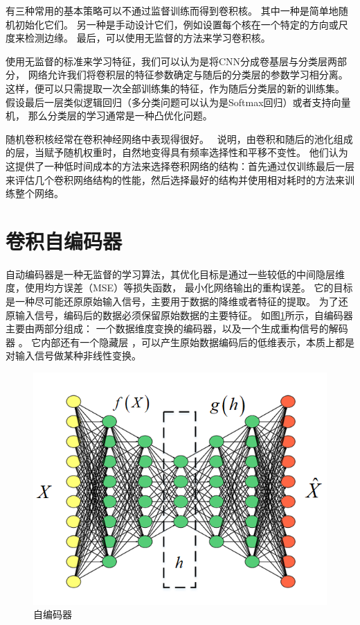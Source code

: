 有三种常用的基本策略可以不通过监督训练而得到卷积核。
其中一种是简单地随机初始化它们。
另一种是手动设计它们，例如设置每个核在一个特定的方向或尺度来检测边缘。
最后，可以使用无监督的方法来学习卷积核。\par

使用无监督的标准来学习特征，我们可以认为是将CNN分成卷基层与分类层两部分，
网络允许我们将卷积层的特征参数确定与随后的分类层的参数学习相分离。
这样，便可以只需提取一次全部训练集的特征，作为随后分类层的新的训练集。
假设最后一层类似逻辑回归（多分类问题可以认为是Softmax回归）或者支持向量机，
那么分类层的学习通常是一种凸优化问题。\par
随机卷积核经常在卷积神经网络中表现得很好。
\cite{Saxe-ICML2011}~说明，由卷积和随后的池化组成的层，当赋予随机权重时，自然地变得具有频率选择性和平移不变性。
他们认为这提供了一种低时间成本的方法来选择卷积网络的结构：首先通过仅训练最后一层来评估几个卷积网络结构的性能，然后选择最好的结构并使用相对耗时的方法来训练整个网络。

\section{卷积自编码器}

自动编码器是一种无监督的学习算法，其优化目标是通过一些较低的中间隐层维度，使用均方误差（MSE）等损失函数，
最小化网络输出的重构误差。
它的目标是一种尽可能还原原始输入信号，主要用于数据的降维或者特征的提取。
为了还原输入信号，编码后的数据必须保留原始数据的主要特征。
如图\ref{sec:fig_2_5}所示，自编码器主要由两部分组成：
一个数据维度变换的编码器，以及一个生成重构信号的解码器 。
它内部还有一个隐藏层 ，可以产生原始数据编码后的低维表示，本质上都是对输入信号做某种非线性变换。\par
\begin{figure}[!h]
	\centering
	\includegraphics[scale=0.7]{figures/chapter_2/fig_2_5}
	\caption{自编码器}	\label{sec:fig_2_5}
\end{figure}

